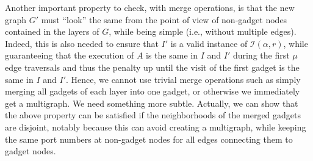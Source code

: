 \documentclass[11pt]{article}
\begin{document}
Another important property to check, with merge operations, is that the new graph $G'$ must ``look'' the same from the point of view of non-gadget nodes contained in the layers of $G$, while being simple (i.e., without multiple edges). Indeed, this is also needed to ensure that $I'$ is a valid instance of $\mathcal{I}(\alpha, r)$, while guaranteeing that the execution of $A$ is the same in $I$ and $I'$ during the first $\mu$ edge traversals and thus the penalty up until the visit of the first gadget is the same in $I$ and $I'$. Hence, we cannot use trivial merge operations such as simply merging all gadgets of each layer into one gadget, or otherwise we immediately get a multigraph. We need something more subtle. Actually, we can show that the above property can be satisfied if the neighborhoods of the merged gadgets are disjoint, notably because this can avoid creating a multigraph, while keeping the same port numbers at non-gadget nodes for all edges connecting them to gadget nodes.
\end{document}
